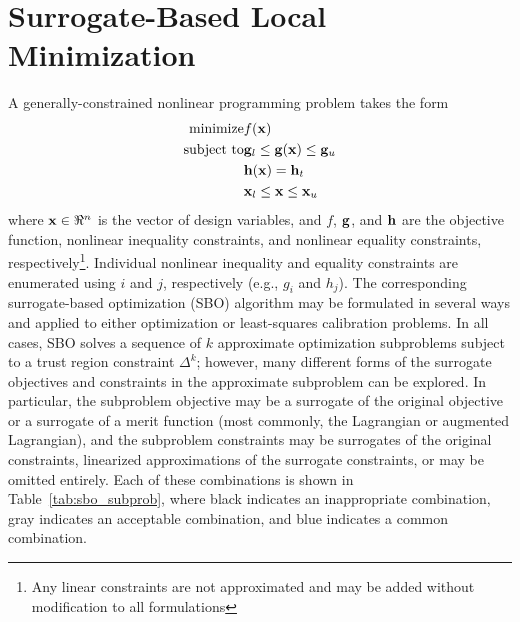 \chapter{Surrogate-Based Local Minimization}\label{sblm}

A generally-constrained nonlinear programming problem takes the form
\begin{eqnarray}
{\rm minimize } \hfil & f({\bf x}) \nonumber \\
{\rm subject\  to } & {\bf g}_l \le {\bf g}({\bf x}) \le {\bf g}_u \nonumber \\
		    &               {\bf h}({\bf x}) = {\bf h}_t \nonumber \\
		    & {\bf x}_l \le {\bf x} \le {\bf x}_u
\label{eq:NLP_standard}
\end{eqnarray}
where ${\bf x} \in \Re^n$ is the vector of design variables, and $f$,
${\bf g}$, and ${\bf h}$ are the objective function, nonlinear
inequality constraints, and nonlinear equality constraints,
respectively\footnote{Any linear constraints are not approximated and
may be added without modification to all formulations}.  Individual
nonlinear inequality and equality constraints are enumerated using $i$
and $j$, respectively (e.g., $g_i$ and $h_j$).  The corresponding
surrogate-based optimization (SBO) algorithm may be formulated in
several ways and applied to either optimization or least-squares
calibration problems. In all cases, SBO solves a sequence of $k$
approximate optimization subproblems subject to a trust region
constraint $\Delta^k$; however, many different forms of the surrogate
objectives and constraints in the approximate subproblem can be
explored.  In particular, the subproblem objective may be a surrogate
of the original objective or a surrogate of a merit function (most
commonly, the Lagrangian or augmented Lagrangian), and the subproblem
constraints may be surrogates of the original constraints, linearized
approximations of the surrogate constraints, or may be omitted
entirely.  Each of these combinations is shown in
Table~\ref{tab:sbo_subprob}, where black indicates an inappropriate
combination, gray indicates an acceptable combination, and blue
indicates a common combination.
